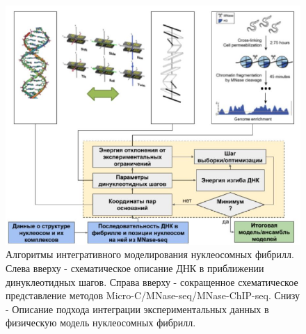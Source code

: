 \begin{figure} [h!]
    \centering
    \includegraphics [width=\textwidth]{images/p1/part1_4_cm/part1_4_cm_f8.pdf}
    \caption[Алгоритмы интегративного моделирования нуклеосомных фибрилл]{Алгоритмы интегративного моделирования нуклеосомных фибрилл. Слева вверху - схематическое описание ДНК в приближении динуклеотидных шагов. Справа вверху - сокращенное схематическое представление методов Micro-C/MNase-seq/MNase-ChIP-seq. Снизу - Описание подхода интеграции экспериментальных данных в физическую модель нуклеосомных фибрилл.}
    \label{fig:p1_4:f8}
\end{figure}










